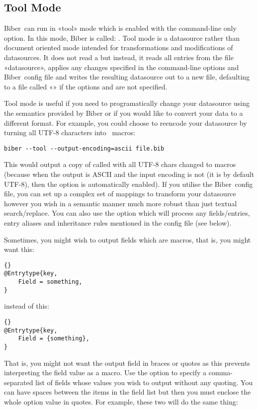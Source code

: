 \documentclass{ltxdockit}
\newcommand*{\biber}{Biber\xspace}
\begin{document}
\subsection{Tool Mode}\label{ref:tool}
\biber\ can run in «tool» mode which is enabled with the 
command-line only option. In this mode, \biber is called: . Tool mode is a datasource rather than document oriented
mode intended for transformations and modifications of datasources. It does
not read a  but instead, it reads all entries from the file
«datasource», applies any changes specified in the command-line options and
\biber\ config file and writes the resulting datasource out to a new file,
defaulting to a \bibtex file called «» if
the options  and  are not specified.

Tool mode is useful if you need to programatically change your datasource
using the semantics provided by \biber or if you would like to convert your
data to a different format. For example, you could choose to reencode your
datasource by turning all UTF-8 characters into \latex\ macros:

\begin{verbatim}
biber --tool --output-encoding=ascii file.bib
\end{verbatim}

\noindent This would output a copy of  called  with all
UTF-8 chars changed to \latex macros (because when the output is ASCII and
the input encoding is not (it is by default UTF-8), then the
 option is automatically enabled). If you utilise the \biber\
config file, you can set up a complex set of mappings to transform
your datasource however you wish in a semantic manner much more robust
than just textual search/replace. You can also use the
 option which will process any 
fields/entries, entry aliases and inheritance rules mentioned in the config
file (see below).

Sometimes, you might wish to output fields which are \bibtex macros,
that is, you might want this:

\begin{lstlisting}[style=bibtex, columns=fixed]{}
@Entrytype{key,
    Field = something,
}
\end{lstlisting}
%
instead of this:
\begin{lstlisting}[style=bibtex, columns=fixed]{}
@Entrytype{key,
    Field = {something},
}
\end{lstlisting}
%
That is, you might not want the output field in braces or quotes as
this prevents \bibtex interpreting the field value as a macro. Use the
\opt{--output-macro-fields} option to specify a comma-separated list
of fields whose values you wish to output without any \bibtex
quoting. You can have spaces between the items in the field list but
then you must enclose the whole option value in quotes. For example,
these two will do the same thing:
\end{document}
